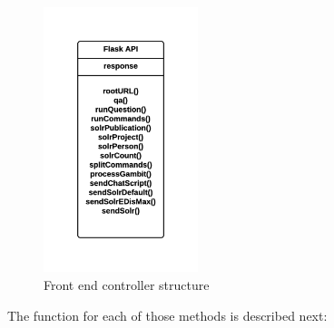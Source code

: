 \begin{figure}[!htbp]
    \centering
    \includegraphics[width=0.4\textwidth]{img/prot2/controllerStructure.png}
    \caption{Front end controller structure}
    \label{fig:gsi-methods1}
\end{figure}

The function for each of those methods is described next:

